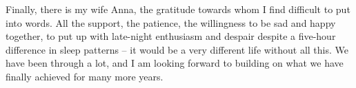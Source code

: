 Finally, there is my wife Anna, the gratitude towards whom I find difficult to put into words. All the support, the patience, the willingness to be sad and happy together, to put up with late-night enthusiasm and despair despite a five-hour difference in sleep patterns -- it would be a very different life without all this. We have been through a lot, and I am looking forward to building on what we have finally achieved for many more years.
